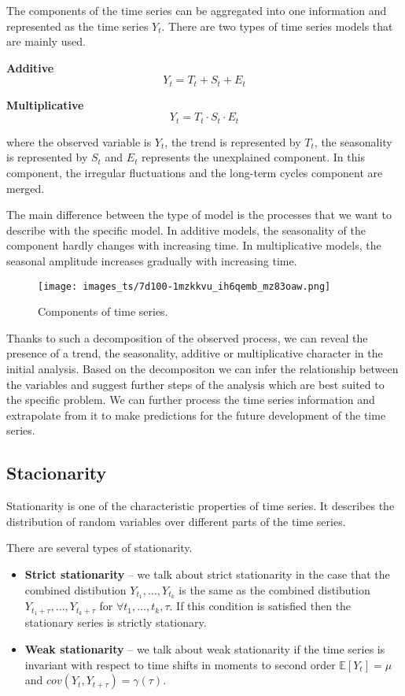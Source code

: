 \documentclass[thesis=M,english]{FITthesis}[2019/12/23]
\begin{document}
The components of the time series can be aggregated into one information and represented as the time series ${Y_t}$. There are two types of time series models that are mainly used.

\textbf{Additive}
\begin{equation*}
Y_t = T_t + S_t + E_t
\end{equation*}

\noindent\textbf{Multiplicative}
\begin{equation*}
Y_t = T_t \cdot S_t \cdot E_t
\end{equation*}

where the observed variable is ${Y_t}$, the trend is represented by ${T_t}$, the seasonality is represented by ${S_t}$ and $E_t$ represents the unexplained component. In this component, the irregular fluctuations and the long-term cycles component are merged.

The main difference between the type of model is the processes that we want to describe with the specific model. In additive models, the seasonality of the component hardly changes with increasing time. In multiplicative models, the seasonal amplitude increases gradually with increasing time.

\begin{figure}[ht!]
    \centering
    \texttt{[image: images\_ts/7d100-1mzkkvu\_ih6qemb\_mz83oaw.png]}
    \caption{Components of time series.} 
    \label{fig:residual_conn}
    
\end{figure}

Thanks to such a decomposition of the observed process, we can reveal the presence of a trend, the seasonality, additive or multiplicative character in the initial analysis.
Based on the decompositon we can infer the relationship between the variables and suggest further steps of the analysis which are best suited to the specific problem.
We can further process the time series information and extrapolate from it to make predictions for the future development of the time series.

\subsection{Stacionarity}
Stationarity is one of the characteristic properties of time series. It describes the distribution of random variables over different parts of the time series. 

There are several types of stationarity.
\begin{itemize}
		\item \textbf{Strict stationarity} -- we talk about strict stationarity in the case that the combined distibution $Y_{t_1},\dots,Y_{t_k}$ is the same as the combined distibution $Y_{t_1 + \tau },\dots,Y_{t_k + \tau}$ for $\forall t_1, \dots, t_k, \tau$. If this condition is satisfied then the stationary series is strictly stationary.  
		\item \textbf{Weak stationarity} -- we talk about weak stationarity if the time series is invariant with respect to time shifts in moments to second order $\mathbb{E}[Y_t] = \mu$ and $cov(Y_t, Y_{t+\tau}) = \gamma(\tau)$.
	\end{itemize}
\end{document}
